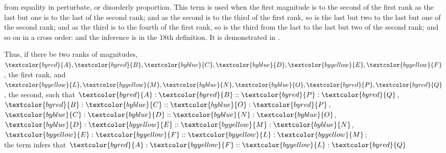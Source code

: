 \documentclass{byrne-book}
\begin{document}
\label{def:V.XX} 
\def\varA{\textcolor{byred}{A}}
\def\varB{\textcolor{byred}{B}}
\def\varC{\textcolor{byblue}{C}}
\def\varD{\textcolor{byblue}{D}}
\def\varE{\textcolor{byyellow}{E}}
\def\varF{\textcolor{byyellow}{F}}
\def\varL{\textcolor{byyellow}{L}}
\def\varM{\textcolor{byyellow}{M}}
\def\varN{\textcolor{byblue}{N}}
\def\varO{\textcolor{byblue}{O}}
\def\varP{\textcolor{byred}{P}}
\def\varQ{\textcolor{byred}{Q}}
 from equality in perturbate, or disorderly proportion. This term is used when the first magnitude is to the second of the first rank as the last but one is to the last of the second rank; and as the second is to the third of the first rank, so is the last but two to the last but one of the second rank; and as the third is to the fourth of the first rank, so is the third from the last to the last but two of the second rank; and so on in a cross order: and the inference is in the 18th definition. It is demonstrated in .

\begin{center}
Thus, if there be two ranks of magnitudes,\\
$\varA, \varB, \varC, \varD, \varE, \varF$, the first rank,
and $\varL, \varM, \varN, \varO, \varP, \varQ$, the second,
such that $\varA : \varB :: \varP : \varQ$, $\varB : \varC :: \varO : \varP$, $\varC : \varD :: \varN : \varO$, $\varD : \varE :: \varM : \varN$, $\varE : \varF :: \varL : \varM$;\\
the term  infers that $\varA : \varF :: \varL : \varQ$
\end{center}

\vfill\pagebreak

\label{prop:V.XX}
\end{document}
